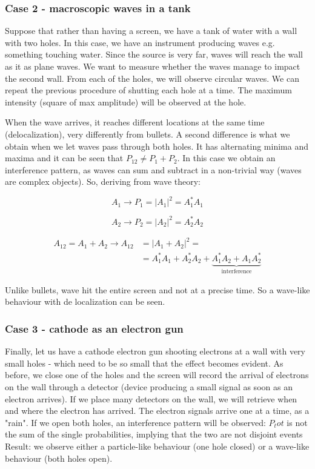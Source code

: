   
    \subsubsection{Case 2 - macroscopic waves in a tank}
    Suppose that rather than having a screen, we have a tank of water with a wall with two holes. In this case, we have an instrument producing waves e.g. something touching water. Since the source is very far, waves will reach the wall as it as plane waves. We want to measure whether the waves manage to impact the second wall. From each of the holes, we will observe circular waves. We can repeat the previous procedure of shutting each hole at a time. The maximum intensity (square of max amplitude) will be observed at the hole. 

When the wave arrives, it reaches different locations at the same time (delocalization), very differently from bullets. A second difference is what we obtain when we let waves pass through both holes. It has alternating minima and maxima and it can be seen that $P_{12} \neq P_1+P_2$. In this case we obtain an interference pattern, as waves can sum and subtract in a non-trivial way (waves are complex objects).
    So, deriving from wave theory:

    $$A_1\rightarrow P_1 = |A_1|^2 = A_1^*A_1$$
      
    $$A_2\rightarrow P_2 = |A_2|^2 = A_2^*A_2$$

    \begin{align*}
      A_{12} = A_1+A_2\rightarrow A_{12} &= |A_1+A_2|^2=\\
                                         &=A_1^*A_1 + A_2^*A_2 + \underbrace{A_1^*A_2 + A_1A_2^*}_{\text{interference}}
    \end{align*}

    Unlike bullets, wave hit the entire screen and not at a precise time.
    So a wave-like behaviour with de localization can be seen.

    \subsubsection{Case 3 - cathode as an electron gun}
    Finally, let us have a cathode electron gun shooting electrons at a wall with very small holes - which need to be so small that the effect becomes      evident. As before, we close one of the holes and the screen will record the arrival of electrons on the wall through a detector (device producing a small signal as soon as an electron arrives). If we place many detectors on the wall, we will retrieve when and where the electron has arrived. The electron signals arrive one at a time, as a "rain". If we open both holes, an interference pattern will be observed: $P_tot$ is not the sum of the single probabilities, implying that the two are not disjoint events 
Result: we observe either a particle-like behaviour (one hole closed) or a wave-like behaviour (both holes open).
    
